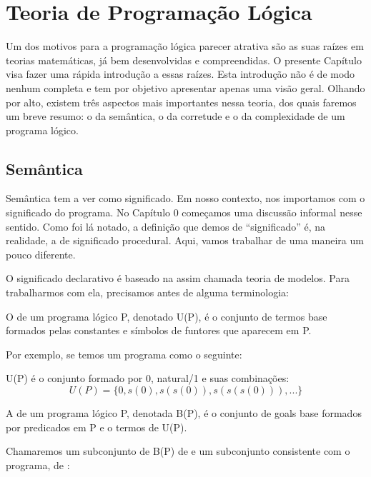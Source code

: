 \documentclass{article}
\begin{document}
\section{Teoria de Programação Lógica}

Um dos motivos para a programação lógica parecer atrativa são as suas raízes em teorias matemáticas, já bem desenvolvidas e compreendidas. O presente Capítulo visa fazer uma rápida introdução a essas raízes. Esta introdução não é de modo nenhum completa e tem por objetivo apresentar apenas uma visão geral. Olhando por alto, existem três aspectos mais importantes nessa teoria, dos quais faremos um breve resumo: o da semântica, o da corretude e o da complexidade de um programa lógico.

\subsection{Semântica}
Semântica tem a ver como significado. Em nosso contexto, nos importamos com o significado do programa. No Capítulo 0 %
começamos uma discussão informal nesse sentido. Como foi lá notado, a definição que demos de ``significado'' é, na realidade, a de significado procedural. Aqui, vamos trabalhar de uma maneira um pouco diferente.

O significado declarativo é baseado na assim chamada teoria de modelos. Para trabalharmos com ela, precisamos antes de alguma terminologia:

\begin{definition} O  de um programa lógico P, denotado U(P), é o conjunto de termos base formados pelas constantes e símbolos de funtores que aparecem em P.
\end{definition}

Por exemplo, se temos um programa como o seguinte:


\label{lst:natural}

U(P) é o conjunto formado por 0, natural/1 e suas combinações:
\[
  U(P) = \{0, s(0), s(s(0)), s(s(s(0))), ...\}
\]

\begin{definition} A  de um programa lógico P, denotada B(P), é o conjunto de goals base formados por predicados em P e o termos de U(P).
\end{definition}

  Chamaremos um subconjunto de B(P) de  e um subconjunto consistente com o programa, de :
\end{document}
